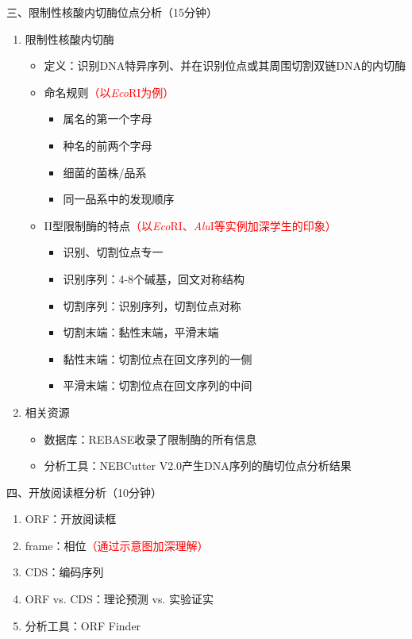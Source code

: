 \documentclass{TIJMUjiaoanLL}
\begin{document}
\vspace*{0.2cm}
\noindent
三、限制性核酸内切酶位点分析（15分钟）
\begin{enumerate}
  \item 限制性核酸内切酶
    \begin{itemize}
      \item 定义：识别DNA特异序列、并在识别位点或其周围切割双链DNA的内切酶
      \item 命名规则\textcolor{red}{（以\textit{Eco}RI为例）}
        \begin{itemize}
          \item 属名的第一个字母
          \item 种名的前两个字母
          \item 细菌的菌株/品系
          \item 同一品系中的发现顺序
        \end{itemize}
    \end{itemize}


\otherTail
\newpage
\otherHeader


    \begin{itemize}
      \item II型限制酶的特点\textcolor{red}{（以\textit{Eco}RI、\textit{Alu}I等实例加深学生的印象）}
      \begin{itemize}
        \item 识别、切割位点专一
        \item 识别序列：4-8个碱基，回文对称结构
        \item 切割序列：识别序列，切割位点对称
        \item 切割末端：黏性末端，平滑末端
        \item 黏性末端：切割位点在回文序列的一侧
        \item 平滑末端：切割位点在回文序列的中间
      \end{itemize}
    \end{itemize}
  \item 相关资源
    \begin{itemize}
      \item 数据库：REBASE收录了限制酶的所有信息
      \item 分析工具：NEBCutter V2.0产生DNA序列的酶切位点分析结果
    \end{itemize}
\end{enumerate}

\vspace*{0.2cm}
\noindent
四、开放阅读框分析（10分钟）
\begin{enumerate}
  \item ORF：开放阅读框
  \item frame：相位\textcolor{red}{（通过示意图加深理解）}
  \item CDS：编码序列
  \item ORF vs. CDS：理论预测 vs. 实验证实
  \item 分析工具：ORF Finder
\end{enumerate}
\end{document}
